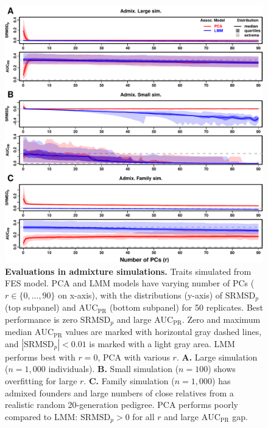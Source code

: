 \documentclass[11pt]{article}
\newcommand{\rmsd}{\text{SRMSD}_p}
\newcommand{\auc}{\text{AUC}_\text{PR}}
\begin{document}
\begin{figure}[bp!]
  \centering
  \includegraphics[width=\textwidth,height=\textheight,keepaspectratio]{fes/rmsd-auc-sim.pdf}
  \caption{
    {\small 
      {\bf Evaluations in admixture simulations.}
      Traits simulated from FES model.
      PCA and LMM models have varying number of PCs ($r \in \{0, ..., 90\}$ on x-axis), with the distributions (y-axis) of $\rmsd$ (top subpanel) and $\auc$ (bottom subpanel) for 50 replicates.
      Best performance is zero $\rmsd$ and large $\auc$.
      Zero and maximum median $\auc$ values are marked with horizontal gray dashed lines, and $|\rmsd| < 0.01$ is marked with a light gray area.
      LMM performs best with $r=0$, PCA with various $r$.
      \textbf{A.}
      Large simulation ($n = 1,000$ individuals).
      \textbf{B.}
      Small simulation ($n = 100$) shows overfitting for large $r$.
      \textbf{C.}
      Family simulation ($n = 1,000$) has admixed founders and large numbers of close relatives from a realistic random 20-generation pedigree.
      PCA performs poorly compared to LMM: $\rmsd > 0$ for all $r$ and large $\auc$ gap.
    }
  }
  \label{fig:rmsd-auc-sim}
\end{figure}
\end{document}
